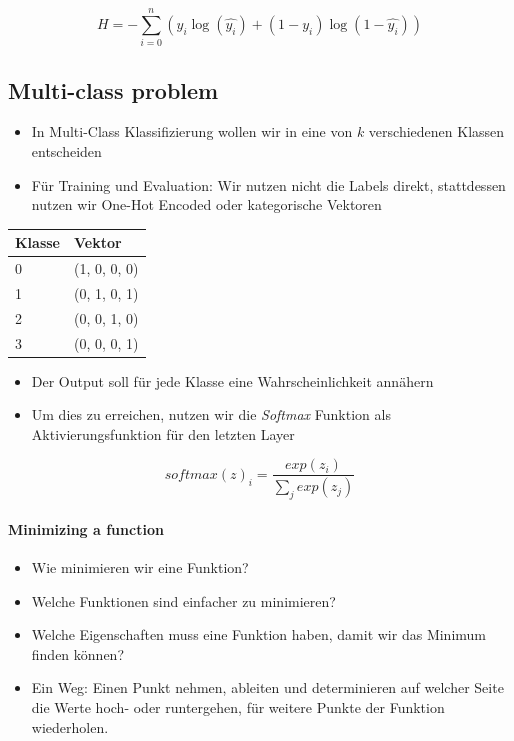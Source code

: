 \documentclass[a4paper]{article}
\begin{document}
		$$ H = - \sum_{i=0}^{n} ( y_{i} \log ( \hat{y_{i}} ) + ( 1 - y_{i} ) \log ( 1 - \hat{y_{i}} ) ) $$
		
		\subsection{Multi-class problem}
		
		\begin{itemize}
			\item In Multi-Class Klassifizierung wollen wir in eine von $k$ verschiedenen Klassen entscheiden
			\item Für Training und Evaluation: Wir nutzen nicht die Labels direkt, stattdessen nutzen wir One-Hot Encoded oder kategorische Vektoren
		\end{itemize}
	
		\begin{table}[htb!]
			\centering
			\begin{tabular}{|l|l|}
				\hline
				\textbf{Klasse} & \textbf{Vektor} \\ \hline \hline
				0               & (1, 0, 0, 0)    \\ \hline
				1               & (0, 1, 0, 1)    \\ \hline
				2               & (0, 0, 1, 0)    \\ \hline
				3               & (0, 0, 0, 1)    \\ \hline
			\end{tabular}
		\end{table}
	
		\begin{itemize}
			\item Der Output soll für jede Klasse eine Wahrscheinlichkeit annähern
			\item Um dies zu erreichen, nutzen wir die \textit{Softmax} Funktion als Aktivierungsfunktion für den letzten Layer
		\end{itemize}
	
		$$ softmax(z)_{i} = \frac{exp(z_{i})}{\sum_{j} exp(z_{j})} $$
		
		\paragraph{Minimizing a function}
		
		\begin{itemize}
			\item Wie minimieren wir eine Funktion?
			\item Welche Funktionen sind einfacher zu minimieren?
			\item Welche Eigenschaften muss eine Funktion haben, damit wir das Minimum finden können?
			\item Ein Weg: Einen Punkt nehmen, ableiten und determinieren auf welcher Seite die Werte hoch- oder runtergehen, für weitere Punkte der Funktion wiederholen.
		\end{itemize}
	
\end{document}
